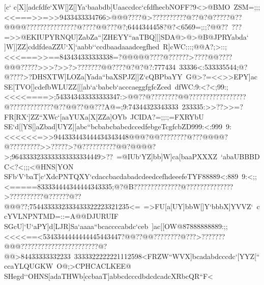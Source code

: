 {{{ [c`}
 \hbox{c[X][adcfdfe`XW[]Z[]Ya`baabdb]Uaaccdcc`cfdfhecbNOFF?9<>@BMO%
 ZSM=;;;<<===>>=>>9433433334766>@@@????@>??????????@??@?@?????@??@@@@???????????????@????@@???@?;6444344458?@?<6569=;:;?@@??%
 ???=>>@EKIUPYRNQU]ZabZa``[ZHEYY``aaTBQ]]]SDA@>@>@B@JPRYabda`%
 }
 \hbox{]W]]ZZ]cddfdeaZZU`X]`aabb``ccdbaadaaadcegfhed%
 R]cWC:::;@@A?;>::;<<<===>>==843434333333338=?@@@@@????@??????>????@@????@@@?????>>>?>>?>???????@@????@?@?@?:777434%
 33336<:533335544;@?@????>?DHSXTW]LOZa[Yada``baXSPJZ]]Z`cQBPbaYY%
 G@>?=<<>>EPY]ac}
 \hbox{SE[TVO[]cdefbWLUZZ[[[ab`a`babcb`acccaeggfgfcZced%
 dfWC:9:<?<;99:;<<<<====>;543343433333333347:>@@??@????????@@?????????????????@?????????????@??@@??@@???A@=;9:74344323343333%
 233335:>>??>>=?FR[RX`]ZZ``XWc`[aaYUXa[X[ZZa]OYb%
 JCIDA?=;;:;=FXRYbU}
 \hbox{SE`d[[YS[]aZbad]UYZ][abc``bcbabcbabcdccedfebgeTcgfcbZD999:<:999%
 9:<<<<<<=>>944333443444434343448@@@?@@????????@???@@@@?@?????????>>?????>?@??????????@@?@@@@?>;9643333233333333333334449>??%
 =@IUb`YZ]bb]W]ca[baaPXXXZ%
 `abaUBBBDC<?<;;;<@HNS[YON}
 \hbox{SFb`V`baT]c`XdcPNTQXY`cdaccbacdabadcdeedcefhdeeefeTYF88889<:889%
 9:<;;<=====833334444344444343335;@?@B??????????????@??????????????>??????????@??????@??@@@??;7544333332333433322223321235<=%
 =>FU[a[UY]bbW[]Y`bbbX]YVVZ`%
 ccYVLNPNTMD=::=A@@DJURUIF}
 \hbox{SGcU]`U`aPY]d[LJR]Sa`aaaa``bcaccccabdc`ceb%
 ]ac[[OW@87888888889:;;<<<<==<5343344444444445443447?@@??@@????????@???>???????@@@???????????????????????@?@@>84433333332233%
 3333322222221112598<FRZW``WVX]bcadabdcccdc`[YYZ[``ccaYLQUGKW%
 O@;>CPHCACLKEE@}
 \hbox{SHegd``OHNS[adaTHWb[ccbaaT]abbcdcccdbdcdcadcXRbcQR``F<%
}}}
